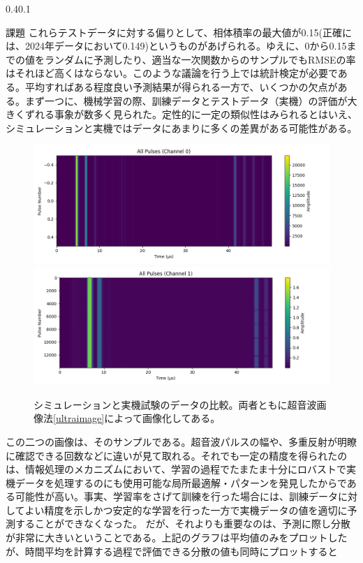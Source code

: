 \documentclass[uplatex]{suribt}
\makeatletter
\renewcommand{\subsection}{%
    \@startsection{subsection}{1}{\z@}%
    {0.4\Cvs}{0.1\Cvs}%
    {\normalfont\normalsize\headfont\raggedright}}
\makeatother
\begin{document}
\subsection{課題}
これらテストデータに対する偏りとして、相体積率の最大値が0.15(正確には、2024年データにおいて0.149)というものがあげられる。ゆえに、0から0.15までの値をランダムに予測したり、適当な一次関数からのサンプルでもRMSEの率はそれほど高くはならない。このような議論を行う上では統計検定が必要である。平均すればある程度良い予測結果が得られる一方で、いくつかの欠点がある。まず一つに、機械学習の際、訓練データとテストデータ（実機）の評価が大きくずれる事象が数多く見られた。定性的に一定の類似性はみられるとはいえ、シミュレーションと実機ではデータにあまりに多くの差異がある可能性がある。\par
\begin{figure}[hbp]
    \centering
    \includegraphics[width=0.5\linewidth]{pictures/explanation/solid_liquid7_processed_0img.png}
    \includegraphics[width=0.5\linewidth]{pictures/explanation/P20240726-1600_processed_1img.png}
    \caption{シミュレーションと実機試験のデータの比較。両者ともに超音波画像法\ref{ultraimage}によって画像化してある。}
    \label{fig:noerrorbar}
\end{figure}
この二つの画像は、そのサンプルである。超音波パルスの幅や、多重反射が明瞭に確認できる回数などに違いが見て取れる。それでも一定の精度を得られたのは、情報処理のメカニズムにおいて、学習の過程でたまたま十分にロバストで実機データを処理するのにも使用可能な局所最適解・パターンを発見したからである可能性が高い。事実、学習率をさげて訓練を行った場合には、訓練データに対してよい精度を示しかつ安定的な学習を行った一方で実機データの値を適切に予測することができなくなった。
だが、それよりも重要なのは、予測に際し分散が非常に大きいということである。上記のグラフは平均値のみをプロットしたが、時間平均を計算する過程で評価できる分散の値も同時にプロットすると
\end{document}
